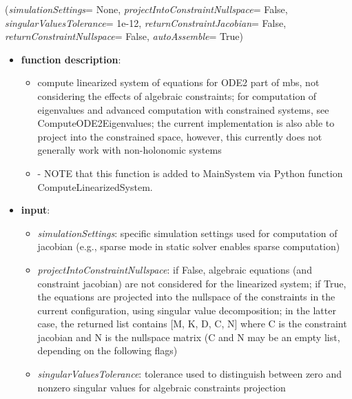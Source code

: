 %
\begin{flushleft}
\label{sec:mainsystemextensions:ComputeLinearizedSystem}
({\it simulationSettings}= None, {\it projectIntoConstraintNullspace}= False, {\it singularValuesTolerance}= 1e-12, {\it returnConstraintJacobian}= False, {\it returnConstraintNullspace}= False, {\it autoAssemble}= True)
\end{flushleft}
\setlength{\itemindent}{0.7cm}
\begin{itemize}[leftmargin=0.7cm]
\item[--]
{\bf function description}: \vspace{-6pt}
\begin{itemize}[leftmargin=1.2cm]
\setlength{\itemindent}{-0.7cm}
\item[]compute linearized system of equations for ODE2 part of mbs, not considering the effects of algebraic constraints; for computation of eigenvalues and advanced computation with constrained systems, see ComputeODE2Eigenvalues; the current implementation is also able to project into the constrained space, however, this currently does not generally work with non-holonomic systems
\item[]- NOTE that this function is added to MainSystem via Python function ComputeLinearizedSystem.
\end{itemize}
\item[--]
{\bf input}: \vspace{-6pt}
\begin{itemize}[leftmargin=1.2cm]
\setlength{\itemindent}{-0.7cm}
\item[]{\it simulationSettings}: specific simulation settings used for computation of jacobian (e.g., sparse mode in static solver enables sparse computation)
\item[]{\it projectIntoConstraintNullspace}: if False, algebraic equations (and constraint jacobian) are not considered for the linearized system; if True, the equations are projected into the nullspace of the constraints in the current configuration, using singular value decomposition; in the latter case, the returned list contains [M, K, D, C, N] where C is the constraint jacobian and N is the nullspace matrix (C and N may be an empty list, depending on the following flags)
\item[]{\it singularValuesTolerance}: tolerance used to distinguish between zero and nonzero singular values for algebraic constraints projection

\end{itemize}
\end{itemize}
